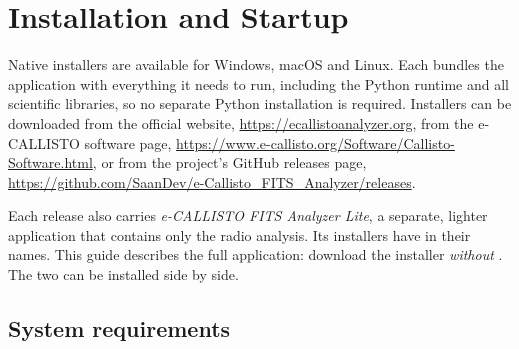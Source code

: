 \chapter{Installation and Startup}
\label{ch:installation}

Native installers are available for Windows, macOS and Linux. Each bundles the
application with everything it needs to run, including the Python runtime and all
scientific libraries, so no separate Python installation is required. Installers can be
downloaded from the official website, \url{https://ecallistoanalyzer.org}, from the
e-CALLISTO software page, \url{https://www.e-callisto.org/Software/Callisto-Software.html},
or from the project's GitHub releases page,
\url{https://github.com/SaanDev/e-Callisto_FITS_Analyzer/releases}.

\begin{note}
  Each release also carries \emph{e-CALLISTO FITS Analyzer Lite}, a
  separate, lighter application that contains only the radio analysis. Its installers have
   in their names. This guide describes the full application: download the
  installer \emph{without} . The two can be installed side by side.
\end{note}

\section{System requirements}
\label{sec:requirements}

